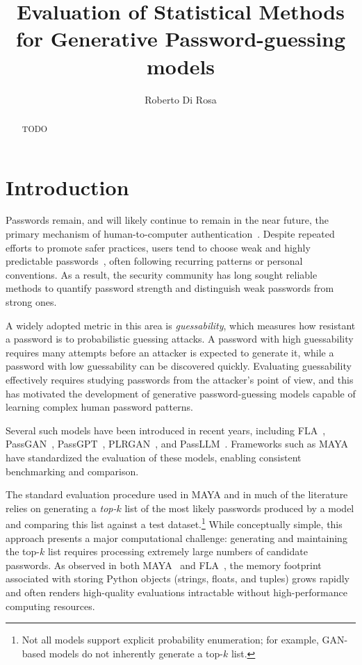 \documentclass[english,noexaminfo,a4paper,oneside, binding = 0.6cm]{sapthesis}
\title{Evaluation of Statistical Methods for Generative Password-guessing models}
\author{Roberto Di Rosa}
\begin{document}
\frontmatter
\maketitle

\begin{abstract}
  TODO
\end{abstract}

\tableofcontents

\mainmatter

\chapter{Introduction}
\lettrine[lines=2, findent=3pt, nindent=0pt]{P}{}asswords remain, and will likely continue to remain in the near future, the primary mechanism of human-to-computer authentication~\cite{}. Despite repeated efforts to promote safer practices, users tend to choose weak and highly predictable passwords~\cite{}, often following recurring patterns or personal conventions. As a result, the security community has long sought reliable methods to quantify password strength and distinguish weak passwords from strong ones.

A widely adopted metric in this area is \textit{guessability}, which measures how resistant a password is to probabilistic guessing attacks. A password with high guessability requires many attempts before an attacker is expected to generate it, while a password with low guessability can be discovered quickly. Evaluating guessability effectively requires studying passwords from the attacker’s point of view, and this has motivated the development of generative password-guessing models capable of learning complex human password patterns.

Several such models have been introduced in recent years, including FLA~\cite{ref:fla}, PassGAN~\cite{ref:passgan}, PassGPT~\cite{ref:passgpt}, PLRGAN~\cite{ref:pasquini}, and PassLLM~\cite{ref:pwdguessllm}. Frameworks such as MAYA~\cite{ref:maya} have standardized the evaluation of these models, enabling consistent benchmarking and comparison.

The standard evaluation procedure used in MAYA and in much of the literature relies on generating a \textit{top-$k$} list of the most likely passwords produced by a model and comparing this list against a test dataset.\footnote{Not all models support explicit probability enumeration; for example, GAN-based models do not inherently generate a top-$k$ list.} While conceptually simple, this approach presents a major computational challenge: generating and maintaining the top-$k$ list requires processing extremely large numbers of candidate passwords. As observed in both MAYA~\cite{ref:maya} and FLA~\cite{ref:fla}, the memory footprint associated with storing Python objects (strings, floats, and tuples) grows rapidly and often renders high-quality evaluations intractable without high-performance computing resources.
\end{document}
